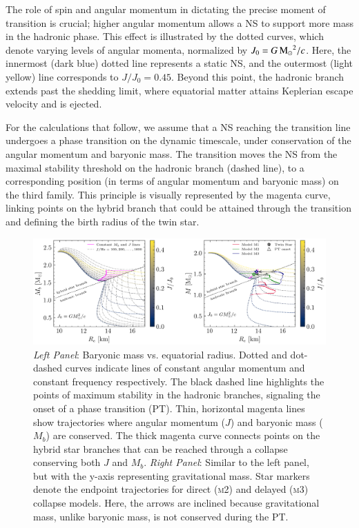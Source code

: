 \documentclass[main.tex]{subfiles}
\begin{document}
    The role of spin and angular momentum in dictating the precise moment of transition is crucial; higher angular momentum allows a NS to support more mass in the hadronic phase. This effect is illustrated by the dotted curves, which denote varying levels of angular momenta, normalized by $J_0=G\mathrm{\,M_\odot}^2/c$. Here, the innermost (dark blue) dotted line represents a static NS, and the outermost (light yellow) line corresponds to $J/J_0 = 0.45$. Beyond this point, the hadronic branch extends past the shedding limit, where equatorial matter attains Keplerian escape velocity and is ejected.
    
    For the calculations that follow, we assume that a NS reaching the transition line undergoes a phase transition on the dynamic timescale, under conservation of the angular momentum and baryonic mass. 
    The transition moves the NS from the maximal stability threshold on the hadronic branch (dashed line), to a corresponding position (in terms of angular momentum and baryonic mass) on the third family. This principle is visually represented by the magenta curve, linking points on the hybrid branch that could be attained through the transition and defining the birth radius of the twin star. 
    
    \begin{figure}
        \centering
        \includegraphics[width=\textwidth]{figures/chapter4/m_vs_r_grid.png}
        \caption{\textit{Left Panel}: Baryonic mass vs. equatorial radius. Dotted and dot-dashed curves indicate lines of constant angular momentum and constant frequency respectively. The black dashed line highlights the points of maximum stability in the hadronic branches, signaling the onset of a phase transition (PT). Thin, horizontal magenta lines show trajectories where angular momentum ($J$) and baryonic mass ($M_b$) are conserved. The thick magenta curve connects points on the hybrid star branches that can be reached through a collapse conserving both $J$ and $M_b$.
        \textit{Right Panel}: Similar to the left panel, but with the y-axis representing gravitational mass. Star markers denote the endpoint trajectories for direct (\textsc{m2}) and delayed (\textsc{m3}) collapse models. Here, the arrows are inclined because gravitational mass, unlike baryonic mass, is not conserved during the PT.}
        \label{fig:mvsr}
    \end{figure}
    
\end{document}
